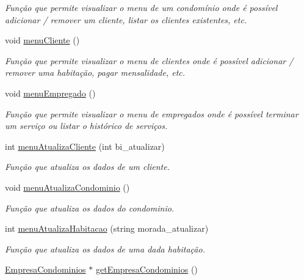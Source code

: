 \begin{DoxyCompactItemize}
\begin{DoxyCompactList}\small\item\em Função que permite visualizar o menu de um condomínio onde é possível adicionar / remover um cliente, listar os clientes existentes, etc. \end{DoxyCompactList}\item 
void \hyperlink{class_interface_a9df9a75b68cd5009f39ff1ae9683d371}{menu\+Cliente} ()\hypertarget{class_interface_a9df9a75b68cd5009f39ff1ae9683d371}{}\label{class_interface_a9df9a75b68cd5009f39ff1ae9683d371}

\begin{DoxyCompactList}\small\item\em Função que permite visualizar o menu de clientes onde é possível adicionar / remover uma habitação, pagar mensalidade, etc. \end{DoxyCompactList}\item 
void \hyperlink{class_interface_a6921af8d7a2a51836bec16fd5f892db3}{menu\+Empregado} ()\hypertarget{class_interface_a6921af8d7a2a51836bec16fd5f892db3}{}\label{class_interface_a6921af8d7a2a51836bec16fd5f892db3}

\begin{DoxyCompactList}\small\item\em Função que permite visualizar o menu de empregados onde é possível terminar um serviço ou listar o histórico de serviços. \end{DoxyCompactList}\item 
int \hyperlink{class_interface_aec1bf503838bf4e4b2b956a5316ff803}{menu\+Atualiza\+Cliente} (int bi\+\_\+atualizar)
\begin{DoxyCompactList}\small\item\em Função que atualiza os dados de um cliente. \end{DoxyCompactList}\item 
void \hyperlink{class_interface_a377af5a888cc9ad6e70184ff505117ba}{menu\+Atualiza\+Condominio} ()\hypertarget{class_interface_a377af5a888cc9ad6e70184ff505117ba}{}\label{class_interface_a377af5a888cc9ad6e70184ff505117ba}

\begin{DoxyCompactList}\small\item\em Função que atualiza os dados do condominio. \end{DoxyCompactList}\item 
int \hyperlink{class_interface_a59857db02ac98caf066093f273d5bf55}{menu\+Atualiza\+Habitacao} (string morada\+\_\+atualizar)
\begin{DoxyCompactList}\small\item\em Função que atualiza os dados de uma dada habitação. \end{DoxyCompactList}\item 
\hyperlink{class_empresa_condominios}{Empresa\+Condominios} $\ast$ \hyperlink{class_interface_abe15128cc0ff75b23aea1500cfa9046e}{get\+Empresa\+Condominios} ()\hypertarget{class_interface_abe15128cc0ff75b23aea1500cfa9046e}{}\label{class_interface_abe15128cc0ff75b23aea1500cfa9046e}


\end{DoxyCompactItemize}
